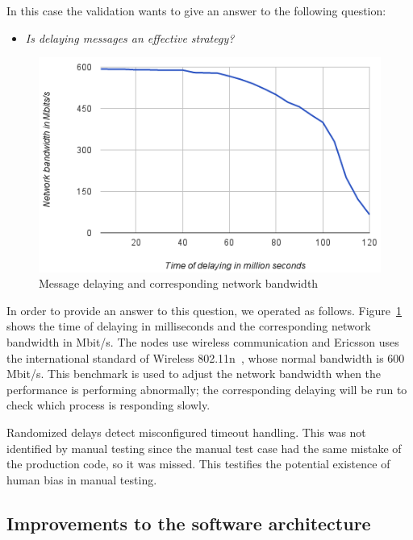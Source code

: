 In this case the validation wants to give an answer to the following question: 

 \begin{itemize}
 \item {\em Is delaying messages an effective strategy?} 
 \end{itemize}

\begin{figure}[hh!]
\centering
\includegraphics[width=\columnwidth]{figure/bendelay.png}
\caption{Message delaying and corresponding network bandwidth \label{bendelay}}
\end{figure}

In order to provide an answer to this question, we operated as follows. 
Figure~\ref{bendelay} shows the time of delaying in milliseconds and the corresponding network bandwidth in Mbit/s. The nodes use wireless communication and Ericsson uses the international standard of Wireless 802.11n~\cite{Wireless}, whose normal bandwidth is 600 Mbit/s. This benchmark is used to adjust the %
network bandwidth when the performance is performing abnormally; the corresponding delaying will be run to check which process is responding slowly.

Randomized delays detect misconfigured timeout handling. This was not identified by manual testing since the manual test case had the same mistake of the production code, so it was missed. This testifies the potential existence of human bias in manual testing.

\subsection{Improvements to the software architecture}

